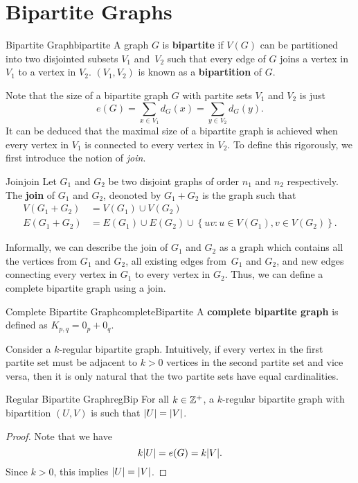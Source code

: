 \documentclass[math, code]{amznotes}
\theoremstyle{remark}
\begin{document}
\section{Bipartite Graphs}
\begin{dfnbox}{Bipartite Graph}{bipartite}
    A graph $G$ is {\color{red} \textbf{bipartite}} if $V(G)$ can be partitioned into two disjointed subsets $V_1$ and~$V_2$ such that every edge of $G$ joins a vertex in $V_1$ to a vertex in $V_2$. $(V_1, V_2)$ is known as a {\color{red} \textbf{bipartition}} of $G$.
\end{dfnbox}
Note that the size of a bipartite graph $G$ with partite sets $V_1$ and $V_2$ is just
\begin{equation*}
    e(G) = \sum_{x \in V_1}d_G(x) = \sum_{y \in V_2}d_G(y).
\end{equation*}
It can be deduced that the maximal size of a bipartite graph is achieved when every vertex in $V_1$ is connected to every vertex in $V_2$. To define this rigorously, we first introduce the notion of \textit{join}.
\begin{dfnbox}{Join}{join}
    Let $G_1$ and $G_2$ be two disjoint graphs of order $n_1$ and $n_2$ respectively. The {\color{red} \textbf{join}} of $G_1$ and $G_2$, deonoted by $G_1 + G_2$ is the graph such that
    \begin{align*}
        V(G_1 + G_2) & = V(G_1) \cup V(G_2) \\
        E(G_1 + G_2) & = E(G_1) \cup E(G_2) \cup \left\{uv \colon u \in V(G_1), v \in V(G_2)\right\}.
    \end{align*}
\end{dfnbox}
Informally, we can describe the join of $G_1$ and $G_2$ as a graph which contains all the vertices from $G_1$ and $G_2$, all existing edges from~$G_1$ and $G_2$, and new edges connecting every vertex in $G_1$ to every vertex in $G_2$. Thus, we can define a complete bipartite graph using a join.
\begin{dfnbox}{Complete Bipartite Graph}{completeBipartite}
    A {\color{red} \textbf{complete bipartite graph}} is defined as $K_{p, q} = 0_p + 0_q$.
\end{dfnbox}
Consider a $k$-regular bipartite graph. Intuitively, if every vertex in the first partite set must be adjacent to $k > 0$ vertices in the second partite set and vice versa, then it is only natural that the two partite sets have equal cardinalities.
\begin{probox}{Regular Bipartite Graph}{regBip}
    For all $k \in \mathbb{Z}^+$, a $k$-regular bipartite graph with bipartition $(U, V)$ is such that ${\left\lvert {U} \right\rvert} = {\left\lvert {V} \right\rvert}$.
    \tcblower
    \begin{proof}
        Note that we have
        \begin{equation*}
            k{\left\lvert {U} \right\rvert} = e(G) = k{\left\lvert {V} \right\rvert}.
        \end{equation*}
        Since $k > 0$, this implies ${\left\lvert {U} \right\rvert} = {\left\lvert {V} \right\rvert}$.
    \end{proof}
\end{probox}
\end{document}
